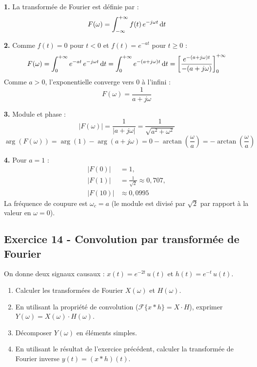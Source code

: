 \documentclass[12pt,a4paper]{article}
\begin{document}
\begin{boitecorrige}
\textbf{1.} La transformée de Fourier est définie par :
\[
F(\omega) = \int_{-\infty}^{+\infty} f(t)\,e^{-j\omega t}\,\mathrm{d} t
\]

\textbf{2.} Comme $f(t) = 0$ pour $t < 0$ et $f(t) = e^{-at}$ pour $t \geq 0$ :
\[
F(\omega) = \int_0^{+\infty} e^{-at}\,e^{-j\omega t}\,\mathrm{d} t = \int_0^{+\infty} e^{-(a+j\omega)t}\,\mathrm{d} t = \left[\frac{e^{-(a+j\omega)t}}{-(a+j\omega)}\right]_0^{+\infty}
\]
Comme $a > 0$, l'exponentielle converge vers $0$ à l'infini :
\[
\boxed{F(\omega) = \frac{1}{a+j\omega}}
\]

\textbf{3.} Module et phase :
\[
|F(\omega)| = \frac{1}{|a+j\omega|} = \frac{1}{\sqrt{a^2+\omega^2}}
\]
\[
\arg(F(\omega)) = \arg(1) - \arg(a+j\omega) = 0 - \arctan\!\left(\frac{\omega}{a}\right) = -\arctan\!\left(\frac{\omega}{a}\right)
\]

\textbf{4.} Pour $a = 1$ :
\begin{align*}
|F(0)|  &= 1,\\
|F(1)|  &= \frac{1}{\sqrt{2}} \approx 0{,}707,\\
|F(10)| &\approx 0{,}0995
\end{align*}
La fréquence de coupure est $\omega_c = a$
(le module est divisé par $\sqrt{2}$ par rapport à la valeur en $\omega = 0$).
\end{boitecorrige}

\subsection*{Exercice 14 - Convolution par transformée de Fourier \niveau{\difficile}}

\begin{boiteexercice}
On donne deux signaux causaux : $x(t) = e^{-2t}\,u(t)$ et $h(t) = e^{-t}\,u(t)$.
\begin{enumerate}
  \item Calculer les transformées de Fourier $X(\omega)$ et $H(\omega)$.
  \item En utilisant la propriété de convolution ($\mathcal{F}\{x*h\} = X\cdot H$), exprimer $Y(\omega) = X(\omega)\cdot H(\omega)$.
  \item Décomposer $Y(\omega)$ en éléments simples.
  \item En utilisant le résultat de l'exercice précédent, calculer la transformée de Fourier inverse $y(t) = (x*h)(t)$.
\end{enumerate}
\end{boiteexercice}
\end{document}

